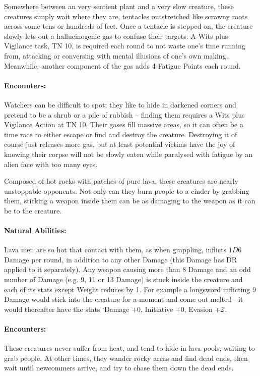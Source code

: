 \label{watcher}
\watcher

Somewhere between an very sentient plant and a very slow creature, these creatures simply wait where they are, tentacles outstretched like scrawny roots across some tens or hundreds of feet.  Once a tentacle is stepped on, the creature slowly lets out a hallucinogenic gas to confuse their targets.  A Wits plus Vigilance task, TN 10, is required each round to not waste one's time running from, attacking or conversing with mental illusions of one's own making.  Meanwhile, another component of the gas adds 4 Fatigue Points each round.

\paragraph{Encounters:} Watchers can be difficult to spot; they like to hide in darkened corners and pretend to be a shrub or a pile of rubbish -- finding them requires a Wits plus Vigilance Action at TN 10.  Their gases fill massive areas, so it can often be a time race to either escape or find and destroy the creature.  Destroying it of course just releases more gas, but at least potential victims have the joy of knowing their corpse will not be slowly eaten while paralysed with fatigue by an alien face with too many eyes.

\label{lavaman}

\lavaman

Composed of hot rocks with patches of pure lava, these creatures are nearly unstoppable opponents.  Not only can they burn people to a cinder by grabbing them, sticking a weapon inside them can be as damaging to the weapon as it can be to the creature.

\paragraph{Natural Abilities:} Lava men are so hot that contact with them, as when grappling, inflicts $1D6$ Damage per round, in addition to any other Damage (this Damage has DR applied to it separately).  Any weapon causing more than 8 Damage and an odd number of Damage (e.g. 9, 11 or 13 Damage) is stuck inside the creature and each of its stats except Weight reduces by 1.  For example a longsword inflicting 9 Damage would stick into the creature for a moment and come out melted - it would thereafter have the stats `Damage +0, Initiative +0, Evasion +2'.

\paragraph{Encounters:} These creatures never suffer from heat, and tend to hide in lava pools, waiting to grab people.  At other times, they wander rocky areas and find dead ends, then wait until newcommers arrive, and try to chase them down the dead ends.

